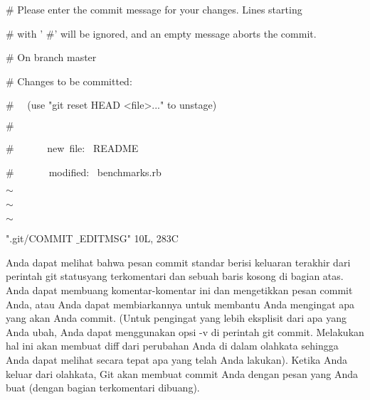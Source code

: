 \vspace{14pt}
\noindent 
{\fontsize{14pt}{14pt}\selectfont  $  \#  $ Please enter the commit message for your changes. Lines starting \\} \par
\noindent 
{\fontsize{14pt}{14pt}\selectfont  $  \#  $ with ' $  \#  $' will be ignored, and an empty message aborts the commit. \\} \par
\noindent 
{\fontsize{14pt}{14pt}\selectfont  $  \#  $ On branch master \\} \par
\noindent 
{\fontsize{14pt}{14pt}\selectfont  $  \#  $ Changes to be committed: \\} \par
\noindent 
{\fontsize{14pt}{14pt}\selectfont  $  \#  $~~ (use "git reset HEAD <file>..." to unstage) \\} \par
\noindent 
{\fontsize{14pt}{14pt}\selectfont  $  \#  $ \\} \par
\noindent 
{\fontsize{14pt}{14pt}\selectfont  $  \#  $~~~~~~ new~file:~  README \\} \par
\noindent 
{\fontsize{14pt}{14pt}\selectfont  $  \#  $~~~~~~~modified:~  benchmarks.rb \\} \par
\noindent 
{\fontsize{14pt}{14pt}\selectfont  $  \sim  $ \\} \par
\noindent 
{\fontsize{14pt}{14pt}\selectfont  $  \sim  $ \\} \par
\noindent 
{\fontsize{14pt}{14pt}\selectfont  $  \sim  $ \\} \par
\noindent 
{\fontsize{14pt}{14pt}\selectfont ".git/COMMIT $  \_  $EDITMSG" 10L, 283C \\} \par
\vspace{14pt}
\noindent 
{\fontsize{14pt}{14pt}\selectfont Anda dapat melihat bahwa pesan commit standar berisi keluaran terakhir dari perintah $  $git statusyang terkomentari dan sebuah baris kosong di bagian atas. Anda dapat membuang komentar-komentar ini dan mengetikkan pesan commit Anda, atau Anda dapat membiarkannya untuk membantu Anda mengingat apa yang akan Anda commit. (Untuk pengingat yang lebih eksplisit dari apa yang Anda ubah, Anda dapat menggunakan opsi $  $-v $  $di perintah $  $git commit. Melakukan hal ini akan membuat diff dari perubahan Anda di dalam olahkata sehingga Anda dapat melihat secara tepat apa yang telah Anda lakukan). Ketika Anda keluar dari olahkata, Git akan membuat commit Anda dengan pesan yang Anda buat (dengan bagian terkomentari dibuang). \\} \par

